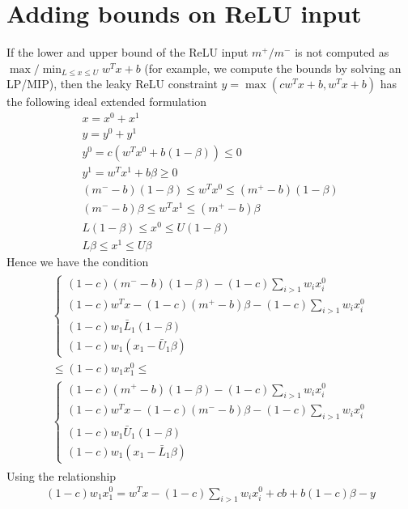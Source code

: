 \documentclass{article}
\begin{document}
\section{Adding bounds on ReLU input}
If the lower and upper bound of the ReLU input $m^+/m^-$ is not computed as $\max/\min_{L\le x\le U} w^Tx+b$ (for example, we compute the bounds by solving an LP/MIP), then the leaky ReLU constraint $y = \max(cw^Tx+b, w^Tx+b)$ has the following ideal extended formulation
\begin{subequations}
	\begin{align}
	x = x^0 + x^1\\
	y = y^0 + y^1\\
	y^0 = c(w^Tx^0 + b(1-\beta))\le 0\\
	y^1 = w^Tx^1+b\beta \ge 0\\
	(m^--b)(1-\beta) \le w^Tx^0 \le(m^+-b)(1-\beta)\\
	(m^--b)\beta\le w^Tx^1\le(m^+-b)\beta\\
	L(1-\beta)\le x^0\le U(1-\beta)\\
	L\beta\le x^1\le U\beta
\end{align}
\end{subequations}
Hence we have the condition
\begin{align}
	\begin{split}
	\begin{cases}
		(1-c)(m^--b)(1-\beta) - (1-c)\sum_{i>1}w_ix^0_i\\
		(1-c)w^Tx - (1-c)(m^+-b)\beta - (1-c)\sum_{i>1}w_ix^0_i\\
		(1-c)w_1\bar{L}_1(1-\beta)\\
		(1-c)w_1(x_1-\bar{U}_1\beta)
	\end{cases}\\
	\le (1-c)w_1x^0_1\le\\
	\begin{cases}
		(1-c)(m^+-b)(1-\beta) - (1-c)\sum_{i>1}w_ix^0_i\\
		(1-c)w^Tx - (1-c)(m^--b)\beta - (1-c)\sum_{i>1}w_ix^0_i\\
		(1-c)w_1\bar{U}_1(1-\beta)\\
		(1-c)w_1(x_1-\bar{L}_1\beta)
	\end{cases}
\end{split}
\end{align}
Using the relationship
\begin{align}
	(1-c)w_1x^0_1 = w^Tx - (1-c)\sum_{i>1}w_ix^0_i + cb  + b(1-c)\beta - y\label{eq:1_c_w1_x01}
\end{align}
\end{document}
